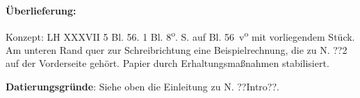 \begin{ledgroupsized}[r]{120mm}
\footnotesize 
\pstart 
\noindent\textbf{\"{U}berlieferung:}
\pend
\end{ledgroupsized}

\begin{ledgroupsized}[r]{114mm}
\footnotesize 
\pstart \parindent -6mm
Konzept: LH XXXVII 5 Bl. 56. 1 Bl. 8\textsuperscript{o}.  S. auf Bl. 56~v\textsuperscript{o} mit vorliegendem St\"{u}ck. Am unteren Rand quer zur Schreibrichtung eine Beispielrechnung, die zu N. ??2 auf der Vorderseite geh\"{o}rt. Papier durch Erhaltungsma{\ss}nahmen stabilisiert. \pend
\end{ledgroupsized}
\vspace*{5mm}
\begin{ledgroup}
\footnotesize
\pstart
\noindent\footnotesize{\textbf{Datierungsgr\"{u}nde}: Siehe oben die Einleitung zu N. ??Intro??.}
\pend
\end{ledgroup}

